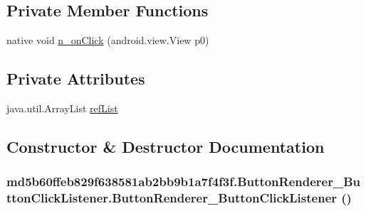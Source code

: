 \subsection*{Private Member Functions}
\begin{CompactItemize}
\item 
native void \hyperlink{classmd5b60ffeb829f638581ab2bb9b1a7f4f3f_1_1_button_renderer___button_click_listener_2f79ac51fa7f46e23c6d938c26b6126e}{n\_\-onClick} (android.view.View p0)
\end{CompactItemize}
\subsection*{Private Attributes}
\begin{CompactItemize}
\item 
java.util.ArrayList \hyperlink{classmd5b60ffeb829f638581ab2bb9b1a7f4f3f_1_1_button_renderer___button_click_listener_f639c4bd0d6eefc3ae17ee1061f4dad3}{refList}
\end{CompactItemize}


\subsection{Constructor \& Destructor Documentation}
\hypertarget{classmd5b60ffeb829f638581ab2bb9b1a7f4f3f_1_1_button_renderer___button_click_listener_b1bac88cf185273fe50fee009b173580}{
\subsubsection[{ButtonRenderer\_\-ButtonClickListener}]{\setlength{\rightskip}{0pt plus 5cm}md5b60ffeb829f638581ab2bb9b1a7f4f3f.ButtonRenderer\_\-ButtonClickListener.ButtonRenderer\_\-ButtonClickListener ()}}
\label{classmd5b60ffeb829f638581ab2bb9b1a7f4f3f_1_1_button_renderer___button_click_listener_b1bac88cf185273fe50fee009b173580}




